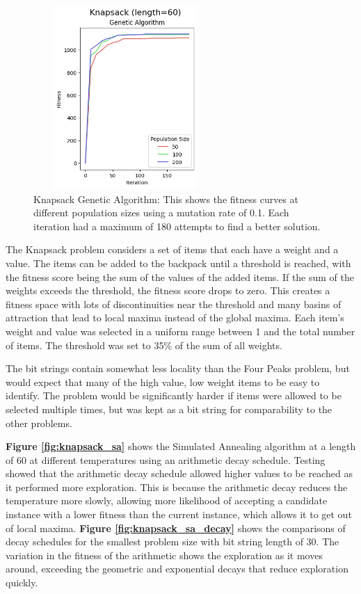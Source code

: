 \documentclass[letterpaper]{article} %
\begin{document}
\begin{figure}[!htb]
\centering
\includegraphics[width=2.75in, height=2.75in]{figures/Knapsack_length=60_Genetic_Algorithm_l_60_ma_60_p_50__100__200_mu_0.1_.png}
\caption{Knapsack Genetic Algorithm: This shows the fitness curves at different population sizes using a mutation rate of 0.1. Each iteration had a maximum of 180 attempts to find a better solution. }
\label{fig:knapsack_ga}
\end{figure}

The Knapsack problem considers a set of items that each have a weight and a value.  The items can be added to the backpack until a threshold is reached, with the fitness score being the sum of the values of the added items.  If the sum of the weights exceeds the threshold, the fitness score drops to zero.  This creates a fitness space with lots of discontinuities near the threshold and many basins of attraction that lead to local maxima instead of the global maxima.   Each item's weight and value was selected in a uniform range between 1 and the total number of items.  The threshold was set to 35\% of the sum of all weights.

The bit strings contain somewhat less locality than the Four Peaks problem, but would expect that many of the high value, low weight items to be easy to identify.  The problem would be significantly harder if items were allowed to be selected multiple times, but was kept as a bit string for comparability to the other problems.

\textbf{Figure \ref{fig:knapsack_sa}} shows the Simulated Annealing algorithm at a length of 60 at different temperatures using an arithmetic decay schedule.  Testing showed that the arithmetic decay schedule allowed higher values to be reached as it performed more exploration.  This is because the arithmetic decay reduces the temperature more slowly, allowing more likelihood of accepting a candidate instance with a lower fitness than the current instance, which allows it to get out of local maxima.  \textbf{Figure \ref{fig:knapsack_sa_decay}} shows the comparisons of decay schedules for the smallest problem size with bit string length of 30.  The variation in the fitness of the arithmetic shows the exploration as it moves around, exceeding the geometric and exponential decays that reduce exploration quickly.
\end{document}
